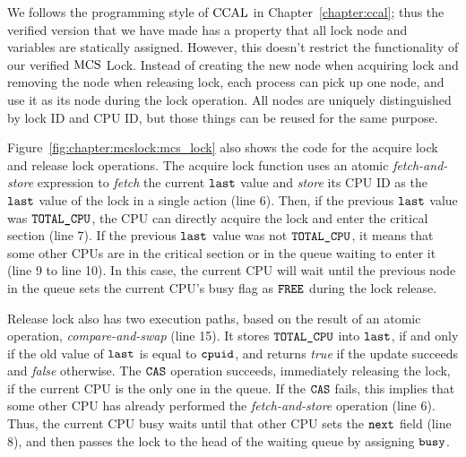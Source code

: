 We follows the programming style of $\mathrm{CCAL}$ in Chapter~\ref{chapter:ccal}; thus
the verified version that we have made has a property that all lock node and variables are statically assigned.
However, this doesn't restrict the functionality of our verified $\mathrm{MCS}$ Lock.
Instead of creating the new node when acquiring lock and removing the node when releasing lock,
each process can pick up one node, and use it as its node during the lock operation. 
All nodes are uniquely distinguished by lock ID and CPU ID, but those
things can be reused for the same purpose.

Figure~\ref{fig:chapter:mcslock:mcs_lock} also shows the code for the acquire lock and
release lock operations.  The acquire lock function uses an atomic {\em
fetch-and-store} expression to {\em fetch} the current ${\mathrm{\texttt{last}}}$
value and {\em store} its CPU ID as the ${\mathrm{\texttt{last}}}$ value of
the lock in a single action (line 6).  Then, if the previous ${\mathrm{\texttt{last}}}$ value
was ${\mathrm{\texttt{TOTAL\_CPU}}}$, the CPU can directly acquire the lock and enter the
critical section (line 7).  If the previous ${\mathrm{\texttt{last}}}$ value was not
${\mathrm{\texttt{TOTAL\_CPU}}}$, it means that some other CPUs are in the critical
section or in the queue waiting to enter it (line 9 to line 10).  In
this case, the current CPU will wait until the previous node in the
queue sets the current CPU's busy flag as ${\mathrm{\texttt{FREE}}}$ during the lock
release.

Release lock also has two execution paths, based on the result of an atomic operation, {\em compare-and-swap} (line 15).
It stores ${\mathrm{\texttt{TOTAL\_CPU}}}$ into ${\mathrm{\texttt{last}}}$, if and only if the old value
of ${\mathrm{\texttt{last}}}$ is equal to ${\mathrm{\texttt{cpuid}}}$, and returns {\em
  true} if the update succeeds and {\em false} otherwise.
The ${\mathrm{\texttt{CAS}}}$ operation succeeds, immediately releasing the lock,
if the current CPU is the only one in the queue.
If the ${\mathrm{\texttt{CAS}}}$ fails, this implies that some other CPU has
already performed the {\em fetch-and-store} operation (line 6). Thus, the current CPU busy waits until that other CPU sets the
${\mathrm{\texttt{next}}}$ field  (line 8), and then passes the lock to the head of the
waiting queue by assigning ${\mathrm{\texttt{busy}}}$.

